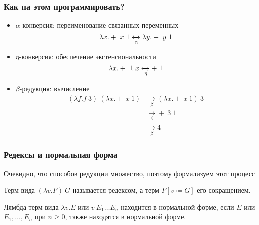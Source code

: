 \begin{frame}
    \frametitle{Как на этом программировать?}

    \begin{itemize}
        \item $\alpha$-конверсия: переименование связанных переменных
              \[\lambda x.+\ x\ 1 \xleftrightarrow[\alpha]{} \lambda y.+\ y\ 1\]
        \item $\eta$-конверсия: обеспечение экстенсиональности
              \[\lambda x.+\ 1\ x \xleftrightarrow[\eta]{} +\ 1\]
        \item $\beta$-редукция: вычисление
              \begin{align*}
                  (\lambda f.f\ 3)\ (\lambda x.+\ x\ 1) & \xrightarrow[\beta]{} (\lambda x.+\ x\ 1)\ 3 \\
                                                        & \xrightarrow[\beta]{} +\ 3\ 1                \\
                                                        & \xrightarrow[\beta]{} 4
              \end{align*}
    \end{itemize}
\end{frame}

\begin{frame}
    \frametitle{Редексы и нормальная форма}

    Очевидно, что способов редукции множество, поэтому формализуем этот процесс

    \begin{definition}
        Терм вида $(\lambda v. F)\ G$ называется редексом, а терм $F[v \coloneq G]$ его сокращением.
    \end{definition}
    \begin{definition}
        Лямбда терм вида $\lambda v. E$ или $v\ E_1 \dots E_n$ находится в нормальной форме, если $E$ или $E_1, \dots, E_n$ при $n \ge 0$, также находятся в нормальной форме.
    \end{definition}

\end{frame}

